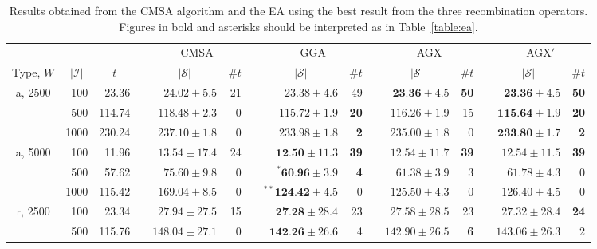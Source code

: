 \documentclass[a4paper,11pt,authoryear]{elsarticle}
\begin{document}
\begin{table}[h]
\setlength{\tabcolsep}{3pt}
\centering
\caption{Results obtained from the CMSA algorithm and the EA using the best result from the three recombination operators. Figures in bold and asterisks should be interpreted as in Table~\ref{table:ea}.}
\scriptsize
\begin{threeparttable}
\begin{tabular}{crrcrrcrrcrrcrr}
	\toprule
	& & & & \multicolumn{2}{c}{CMSA} &\phantom{}& \multicolumn{2}{c}{GGA} &\phantom{}& \multicolumn{2}{c}{AGX} &\phantom{} & \multicolumn{2}{c}{AGX$'$}\\
	\cmidrule{5-6} \cmidrule{8-9} \cmidrule{11-12} \cmidrule{14-15}
	\multicolumn{1}{c}{Type, $W$} & \multicolumn{1}{c}{$|\mathcal{I}|$} & \multicolumn{1}{c}{$t$\tnote{$a$}} && \multicolumn{1}{c}{$|\mathcal{S}|$\tnote{$b$}} & \multicolumn{1}{c}{$\# t$\tnote{$c$}} && \multicolumn{1}{c}{$|\mathcal{S}|$} & \multicolumn{1}{c}{$\# t$} && \multicolumn{1}{c}{$|\mathcal{S}|$} & \multicolumn{1}{c}{$\# t$} && \multicolumn{1}{c}{$|\mathcal{S}|$} & \multicolumn{1}{c}{$\# t$}\\
	\midrule
	a, 2500 & 100 & 23.36 && $24.02 \pm 5.5$ & 21 && $23.38 \pm 4.6$ & 49 && $\textbf{23.36} \pm 4.5$ & \textbf{50} && $\textbf{23.36} \pm 4.5$ & \textbf{50} \\
	& 500 & 114.74 && $118.48 \pm 2.3$ & 0 && $115.72 \pm 1.9$ & \textbf{20} && $ 116.26 \pm 1.9$ & 15 && $\textbf{115.64} \pm 1.9$ & \textbf{20} \\
	& 1000 & 230.24 && $237.10 \pm 1.8$ & 0 && $233.98 \pm 1.8$ & \textbf{2} && $235.00 \pm 1.8$ & 0 && $\textbf{233.80} \pm 1.7$ & \textbf{2} \\
	\midrule
	a, 5000 & 100 & 11.96 && $13.54 \pm 17.4$ & 24 && $\textbf{12.50} \pm 11.3$ & \textbf{39} && $12.54 \pm 11.7$ & \textbf{39} && $12.54 \pm 11.5$ & \textbf{39} \\
	& 500 & 57.62 && $75.60 \pm 9.8$ & 0 && $^{*}\textbf{60.96} \pm 3.9$ & \textbf{4} && $61.38 \pm 3.9$ & 3 && $ 61.78 \pm 4.3$ & 0 \\
	& 1000 & 115.42 && $169.04 \pm 8.5$ & 0 && $^{**}\textbf{124.42} \pm 4.5$ & 0 && $125.50 \pm 4.3$ & 0 && $126.40 \pm 4.5$ & 0 \\
	\midrule
	\midrule
	r, 2500 & 100 & 23.34 && $27.94 \pm 27.5$ & 15 && $\textbf{27.28} \pm 28.4$ & 23 && $ 27.58 \pm 28.5$ & 23 && $27.32 \pm 28.4$ & \textbf{24} \\
	& 500 & 115.76 && $148.04 \pm 27.1$ & 0 && $\textbf{142.26} \pm 26.6$ & 4 && $142.90 \pm 26.5$ & \textbf{6} && $143.06 \pm 26.3$ & 2 \\

\end{tabular}
\end{threeparttable}
\end{table}
\end{document}
